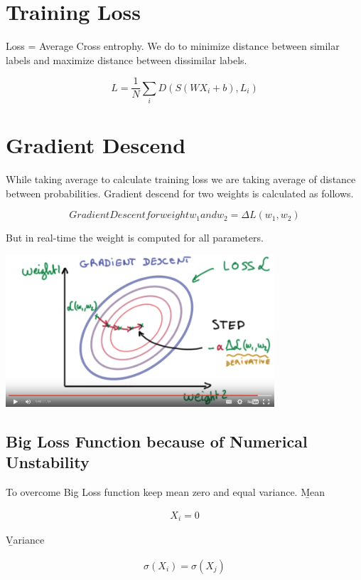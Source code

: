 \documentclass[a4paper,10pt]{article}
\begin{document}
\section{Training Loss}

Loss = Average Cross entrophy. We do  to minimize distance between similar labels and maximize distance between dissimilar labels.

\begin{equation}
 L=\frac{1}{N}{\displaystyle \sum_i D(S(WX_i + b),L_i) }
\end{equation}


\section{Gradient Descend}

While taking average to calculate training loss we are taking average of distance between probabilities. Gradient descend for two weights is calculated as follows.


\begin{equation}
 Gradient Descent for weight w_1 and w_2 = \Delta L(w_1,w_2)
\end{equation}


But in real-time the weight is computed for all parameters.


\includegraphics[width=10cm, height=5 cm]{gradientDescend}
\subsection{Big Loss Function because of Numerical Unstability}

To overcome Big Loss function keep mean zero and equal variance.
\b Mean

\begin{align*} 
 X_i =0 
 \end{align*}

\b Variance

\begin{align*}
 \sigma(X_i) = \sigma(X_j)
\end{align*}
\end{document}
